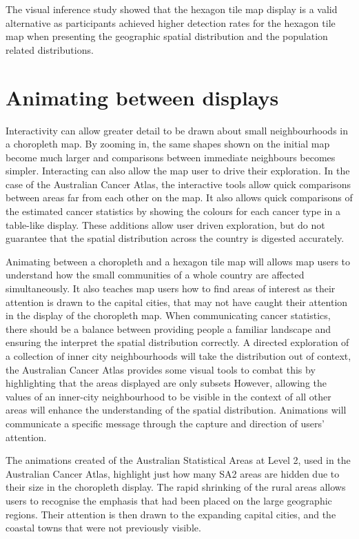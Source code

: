 \documentclass{monashthesis}
\begin{document}
The visual inference study showed that the hexagon tile map display is a valid alternative as participants achieved higher detection rates for the hexagon tile map when presenting the geographic spatial distribution and the population related distributions.

\hypertarget{animating-between-displays}{%
\section{Animating between displays}\label{animating-between-displays}}

Interactivity can allow greater detail to be drawn about small neighbourhoods in a choropleth map. By zooming in, the same shapes shown on the initial map become much larger and comparisons between immediate neighbours becomes simpler.
Interacting can also allow the map user to drive their exploration. In the case of the Australian Cancer Atlas, the interactive tools allow quick comparisons between areas far from each other on the map. It also allows quick comparisons of the estimated cancer statistics by showing the colours for each cancer type in a table-like display. These additions allow user driven exploration, but do not guarantee that the spatial distribution across the country is digested accurately.

Animating between a choropleth and a hexagon tile map will allows map users to understand how the small communities of a whole country are affected simultaneously. It also teaches map users how to find areas of interest as their attention is drawn to the capital cities, that may not have caught their attention in the display of the choropleth map. When communicating cancer statistics, there should be a balance between providing people a familiar landscape and ensuring the interpret the spatial distribution correctly. A directed exploration of a collection of inner city neighbourhoods will take the distribution out of context, the Australian Cancer Atlas provides some visual tools to combat this by highlighting that the areas displayed are only subsets However, allowing the values of an inner-city neighbourhood to be visible in the context of all other areas will enhance the understanding of the spatial distribution. Animations will communicate a specific message through the capture and direction of users' attention.

The animations created of the Australian Statistical Areas at Level 2, used in the Australian Cancer Atlas, highlight just how many SA2 areas are hidden due to their size in the choropleth display. The rapid shrinking of the rural areas allows users to recognise the emphasis that had been placed on the large geographic regions.
Their attention is then drawn to the expanding capital cities, and the coastal towns that were not previously visible.
\end{document}
